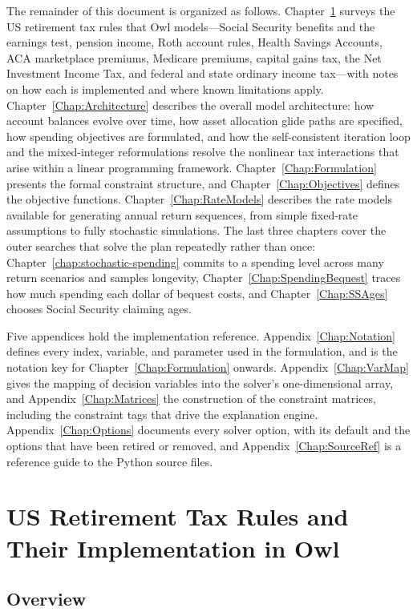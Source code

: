 \documentclass[fleqn,12pt]{report}
\begin{document}
The remainder of this document is organized as follows.
Chapter~\ref{Chap:TaxRules} surveys the US retirement tax rules that Owl
models---Social Security benefits and the earnings test, pension income, Roth
account rules, Health Savings Accounts, ACA marketplace premiums, Medicare
premiums, capital gains tax, the Net Investment Income Tax, and federal and state
ordinary income tax---with notes on how each is implemented and where known
limitations apply.
Chapter~\ref{Chap:Architecture} describes the overall model architecture: how
account balances evolve over time, how asset allocation glide paths are
specified, how spending objectives are formulated, and how the self-consistent
iteration loop and the mixed-integer reformulations resolve the nonlinear tax
interactions that arise within a linear programming framework.
Chapter~\ref{Chap:Formulation} presents the formal constraint structure, and
Chapter~\ref{Chap:Objectives} defines the objective functions.
Chapter~\ref{Chap:RateModels} describes the rate models available for generating
annual return sequences, from simple fixed-rate assumptions to fully stochastic
simulations.
The last three chapters cover the outer searches that solve the plan repeatedly
rather than once: Chapter~\ref{chap:stochastic-spending} commits to a spending
level across many return scenarios and samples longevity,
Chapter~\ref{Chap:SpendingBequest} traces how much spending each dollar of bequest
costs, and Chapter~\ref{Chap:SSAges} chooses Social Security claiming ages.

Five appendices hold the implementation reference.
Appendix~\ref{Chap:Notation} defines every index, variable, and parameter used in
the formulation, and is the notation key for
Chapter~\ref{Chap:Formulation} onwards.
Appendix~\ref{Chap:VarMap} gives the mapping of decision variables into the
solver's one-dimensional array, and Appendix~\ref{Chap:Matrices} the construction
of the constraint matrices, including the constraint tags that drive the
explanation engine.
Appendix~\ref{Chap:Options} documents every solver option, with its default and
the options that have been retired or removed, and
Appendix~\ref{Chap:SourceRef} is a reference guide to the Python source files.

\chapter{US Retirement Tax Rules and Their Implementation in Owl}
\label{Chap:TaxRules}

\section{Overview}
\end{document}
